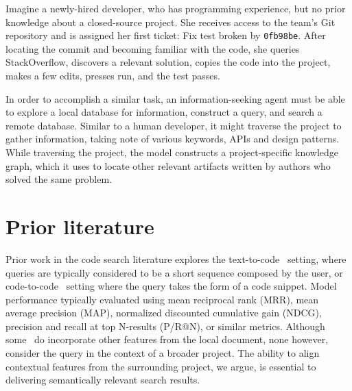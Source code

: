 \documentclass[sigconf]{acmart}
\begin{document}
Imagine a newly-hired developer, who has programming experience, but no prior knowledge about a closed-source project. She receives access to the team's Git repository and is assigned her first ticket: Fix test broken by \texttt{0fb98be}. After locating the commit and becoming familiar with the code, she queries StackOverflow, discovers a relevant solution, copies the code into the project, makes a few edits, presses run, and the test passes.

In order to accomplish a similar task, an information-seeking agent must be able to explore a local database for information, construct a query, and search a remote database. Similar to a human developer, it might traverse the project to gather information, taking note of various keywords, APIs and design patterns. While traversing the project, the model constructs a project-specific knowledge graph, which it uses to locate other relevant artifacts written by authors who solved the same problem.




  \section{Prior literature}\label{sec:prior-literature}

  Prior work in the code search literature explores the text-to-code~\citep{husain2019codesearchnet} setting, where queries are typically considered to be a short sequence composed by the user, or code-to-code~\citep{kim2018facoy} setting where the query takes the form of a code snippet. Model performance typically evaluated using mean reciprocal rank (MRR), mean average precision (MAP), normalized discounted cumulative gain (NDCG), precision and recall at top N-results (P/R@N), or similar metrics. Although some~\citep{asyrofi2020ausearch} do incorporate other features from the local document, none however, consider the query in the context of a broader project. The ability to align contextual features from the surrounding project, we argue, is essential to delivering semantically relevant search results.
\end{document}
